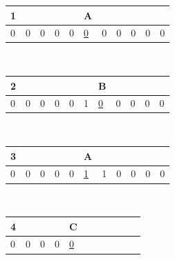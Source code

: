 \begin{table}[h!]
\begin{tabular}{lllllllllll}
1 &  &  &  &  & A &  &  &  &  &  
\\ \hline
\multicolumn{1}{|l|}{\cellcolor[HTML]{FFFFC7}0} 
& \multicolumn{1}{l|}{0} 
& \multicolumn{1}{l|}{\cellcolor[HTML]{FFFFC7}0} 
& \multicolumn{1}{l|}{0} 
& \multicolumn{1}{l|}{\cellcolor[HTML]{FFFFC7}0} 
& \multicolumn{1}{l|}{\ul{0}} 
& \multicolumn{1}{l|}{\cellcolor[HTML]{FFFFC7}0} 
& \multicolumn{1}{l|}{0} 
& \multicolumn{1}{l|}{\cellcolor[HTML]{FFFFC7}0} 
& \multicolumn{1}{l|}{0} 
& \multicolumn{1}{l|}{\cellcolor[HTML]{FFFFC7}0} 
\\ \hline
\end{tabular}
\\
\begin{tabular}{lllllllllll}
2 &  &  &  &  &  & B &  &  &  &  
\\ \hline
\multicolumn{1}{|l|}{\cellcolor[HTML]{FFFFC7}0} 
& \multicolumn{1}{l|}{0} 
& \multicolumn{1}{l|}{\cellcolor[HTML]{FFFFC7}0} 
& \multicolumn{1}{l|}{0} 
& \multicolumn{1}{l|}{\cellcolor[HTML]{FFFFC7}0} 
& \multicolumn{1}{l|}{1} 
& \multicolumn{1}{l|}{\cellcolor[HTML]{FFFFC7}\ul{0}} 
& \multicolumn{1}{l|}{0} 
& \multicolumn{1}{l|}{\cellcolor[HTML]{FFFFC7}0} 
& \multicolumn{1}{l|}{0} 
& \multicolumn{1}{l|}{\cellcolor[HTML]{FFFFC7}0} 
\\ \hline
\end{tabular}
\\
\begin{tabular}{lllllllllll}
3 &  &  &  &  & A &  &  &  &  &  
\\ \hline
\multicolumn{1}{|l|}{\cellcolor[HTML]{FFFFC7}0} 
& \multicolumn{1}{l|}{0} 
& \multicolumn{1}{l|}{\cellcolor[HTML]{FFFFC7}0} 
& \multicolumn{1}{l|}{0} 
& \multicolumn{1}{l|}{\cellcolor[HTML]{FFFFC7}0} 
& \multicolumn{1}{l|}{\ul{1}} 
& \multicolumn{1}{l|}{\cellcolor[HTML]{FFFFC7}1} 
& \multicolumn{1}{l|}{0} 
& \multicolumn{1}{l|}{\cellcolor[HTML]{FFFFC7}0} 
& \multicolumn{1}{l|}{0} 
& \multicolumn{1}{l|}{\cellcolor[HTML]{FFFFC7}0} 
\\ \hline
\end{tabular}
\\
\begin{tabular}{lllllllllll}
4 &  &  &  & C & &  &  &  &  &  
\\ \hline
\multicolumn{1}{|l|}{\cellcolor[HTML]{FFFFC7}0} 
& \multicolumn{1}{l|}{0} 
& \multicolumn{1}{l|}{\cellcolor[HTML]{FFFFC7}0} 
& \multicolumn{1}{l|}{0} 
& \multicolumn{1}{l|}{\cellcolor[HTML]{FFFFC7}\ul{0}} 

\end{tabular}
\end{table}
